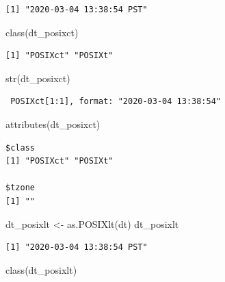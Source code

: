 \documentclass[
]{book}
\newenvironment{Shaded}{\begin{snugshade}}{\end{snugshade}}
\newcommand{\FunctionTok}[1]{\textcolor[rgb]{0.00,0.00,0.00}{#1}}
\newcommand{\NormalTok}[1]{#1}
\newcommand{\OtherTok}[1]{\textcolor[rgb]{0.56,0.35,0.01}{#1}}
\begin{document}
\begin{verbatim}
[1] "2020-03-04 13:38:54 PST"
\end{verbatim}

\begin{Shaded}
\begin{Highlighting}[]
\FunctionTok{class}\NormalTok{(dt\_posixct)}
\end{Highlighting}
\end{Shaded}

\begin{verbatim}
[1] "POSIXct" "POSIXt" 
\end{verbatim}

\begin{Shaded}
\begin{Highlighting}[]
\FunctionTok{str}\NormalTok{(dt\_posixct)}
\end{Highlighting}
\end{Shaded}

\begin{verbatim}
 POSIXct[1:1], format: "2020-03-04 13:38:54"
\end{verbatim}

\begin{Shaded}
\begin{Highlighting}[]
\FunctionTok{attributes}\NormalTok{(dt\_posixct)}
\end{Highlighting}
\end{Shaded}

\begin{verbatim}
$class
[1] "POSIXct" "POSIXt" 

$tzone
[1] ""
\end{verbatim}

\begin{Shaded}
\begin{Highlighting}[]
\NormalTok{dt\_posixlt }\OtherTok{\textless{}{-}} \FunctionTok{as.POSIXlt}\NormalTok{(dt)}
\NormalTok{dt\_posixlt}
\end{Highlighting}
\end{Shaded}

\begin{verbatim}
[1] "2020-03-04 13:38:54 PST"
\end{verbatim}

\begin{Shaded}
\begin{Highlighting}[]
\FunctionTok{class}\NormalTok{(dt\_posixlt)}
\end{Highlighting}
\end{Shaded}
\end{document}
